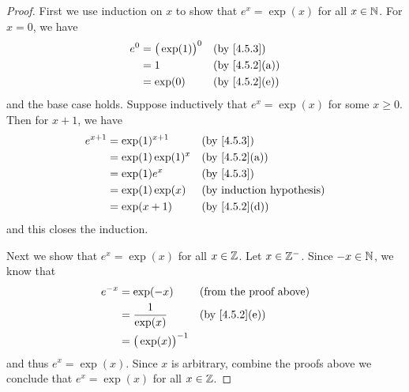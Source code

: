 \begin{proof}
  First we use induction on \(x\) to show that \(e^x = \exp(x)\) for all \(x \in \mathbb{N}\).
  For \(x = 0\), we have
  \begin{align*}
    e^0 & = \big(\exp(1)\big)^0 &  & \by{4.5.3}                  \\
        & = 1                   &  & \text{(by \cref{4.5.2}(a))} \\
        & = \exp(0)             &  & \text{(by \cref{4.5.2}(e))}
  \end{align*}
  and the base case holds.
  Suppose inductively that \(e^x = \exp(x)\) for some \(x \geq 0\).
  Then for \(x + 1\), we have
  \begin{align*}
    e^{x + 1} & = \exp(1)^{x + 1}   &  & \by{4.5.3}                  \\
              & = \exp(1) \exp(1)^x &  & \text{(by \cref{4.5.2}(a))} \\
              & = \exp(1) e^x       &  & \by{4.5.3}                  \\
              & = \exp(1) \exp(x)   &  & \byIH                       \\
              & = \exp(x + 1)       &  & \text{(by \cref{4.5.2}(d))}
  \end{align*}
  and this closes the induction.

  Next we show that \(e^x = \exp(x)\) for all \(x \in \mathbb{Z}\).
  Let \(x \in \mathbb{Z}^-\).
  Since \(-x \in \mathbb{N}\), we know that
  \begin{align*}
    e^{-x} & = \exp(-x)               &  & \text{(from the proof above)} \\
           & = \dfrac{1}{\exp(x)}     &  & \text{(by \cref{4.5.2}(e))}   \\
           & = \big(\exp(x)\big)^{-1}
  \end{align*}
  and thus \(e^x = \exp(x)\).
  Since \(x\) is arbitrary, combine the proofs above we conclude that \(e^x = \exp(x)\) for all \(x \in \mathbb{Z}\).


\end{proof}

